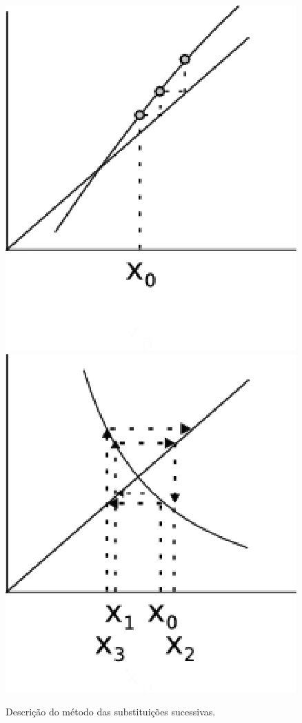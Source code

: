 \begin{figure}[htb]
  \includegraphics[scale=0.9]{capitulos/capitulo1/figuras/substituicoes3.eps}
  \includegraphics[scale=0.9]{capitulos/capitulo1/figuras/substituicoes4.eps}

  \caption{Descrição do método das substituições sucessivas.}
  \label{fig:substituicoes1}  
\end{figure}

